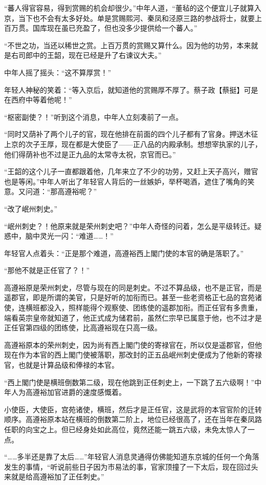 “蕃人得官容易，得到赏赐的机会却很少。”中年人道，“董毡的这个便宜儿子就算入京，当下也不会有太多好处。单是赏赐熙河、秦凤和泾原三路的参战将士，就要上百万贯。国库现在虽已充盈了，但也没多少提供给一个蕃人。”

“不世之功，当还以稀世之赏。上百万贯的赏赐又算什么。因为他的功劳，本来就是右司郎中的王韶，现在已经是升了右谏议大夫。”

中年人摇了摇头：“这不算厚赏！”

年轻人神秘的笑着：“等入京后，就知道他的赏赐厚不厚了。蔡子政【蔡挺】可是在西府中等着他呢！”

“枢密副使？！”听到这个消息，中年人立刻凑前了一点。

“同时又荫补了两个儿子的官，现在他排在前面的四个儿子都有了官身。押送木征上京的次子王厚，现在都是大使臣了——正八品的内殿承制。想想宰执家的儿子，他们得荫补也不过是正九品的太常寺太祝，京官而已。”

“王韶的这个儿子一直都跟着他，几年来立了不少的功劳，又赶上天子高兴，赠官也是等闲。”中年人听出了年轻官人背后的一丝嫉妒，举杯喝酒，遮住了嘴角的笑意。又问道：“那高遵裕呢？”

“改了岷州刺史。”

“岷州刺史？！他原来就是荣州刺史吧？”中年人奇怪的问着，怎么是平级转迁。疑惑中，脑中灵光一闪：“难道……！”

年轻官人点着头：“正是那个难道，高遵裕西上閣门使的本官的确是落职了。”

“那他不就是正任官了？！”

高遵裕原是荣州刺史，尽管与现在的同是刺史。不过不算品级，也不是正官，而是遥郡官，即是所谓的美官，只是好听的加衔而已。甚至一些老资格正七品的宫苑诸使，连横班都没入，照样能得个观察使、团练使的遥郡加衔。而正任官有多贵重，端看英宗皇帝就知道了，他正式成为储君前，虽然仁宗早已属意于他，也不过才是正任官第四级的团练使，比高遵裕现在只高一级。

高遵裕原本的荣州刺史，因为尚有西上閣门使的寄禄官在，所以仅是遥郡官，但他现在作为本官的西上閣门使被落职，那改封的正五品岷州刺史便成为了他新的寄禄官，也就是计算品级和俸禄的本官。

“西上閣门使是横班倒数第二级，现在他跳到正任刺史上，一下跳了五六级啊！”中年人为高遵裕加官进爵的速度感慨着。

小使臣，大使臣，宫苑诸使，横班，然后才是正任官，这是武将的本官官阶的迁转顺序。高遵裕原本站在横班的倒数第二阶上，地位已经很高了，还在当年在秦凤路任职的向宝之上。但已经身处如此高位，竟然还能一跳五六级，未免太惊人了一点。

“……多半还是靠了太后……”年轻官人消息灵通得仿佛能知道东京城的任何一个角落发生的事情，“听说前些日子因为市易法的事，官家顶撞了一下太后，现在回过头来就是给高遵裕加了正任刺史。”

